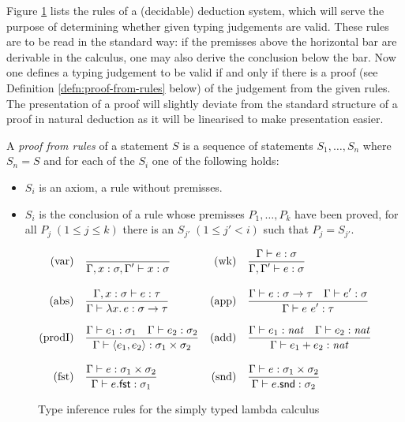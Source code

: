Figure \ref{fig:rules-typed-lambda} lists the rules of a (decidable) deduction
system, which will serve the purpose of determining whether given typing
judgements are valid. These rules are to be read in the standard way: if the
premisses above the horizontal bar are derivable in the calculus, one may also
derive the conclusion below the bar. Now one defines a typing judgement to be
valid if and only if there is a proof (see Definition
\ref{defn:proof-from-rules} below) of the judgement from the given rules. The
presentation of a proof will slightly deviate from the standard structure of a
proof in natural deduction as it will be linearised to make presentation easier.

\begin{defn}
\label{defn:proof-from-rules}
A \emph{proof from rules} of a statement $S$ is a sequence of statements
$S_1,\ldots,S_n$ where $S_n = S$ and for each of the $S_i$ one of the following
holds:
\begin{itemize}
\item $S_i$ is an axiom, \IE a rule without premisses.
\item $S_i$ is the conclusion of a rule whose premisses $P_1,\ldots,P_k$ 
  have been proved, \IE for all $P_j \;(1\leq j\leq k)$ there is an $S_{j'} \;(1\leq j'<i)$
  such that $P_j = S_{j'}$.
\end{itemize}
\end{defn}


\begin{figure}
  \begin{align*}
    \mathrm{(var)}\quad& \frac{\displaystyle }{\displaystyle \Gamma, x:\sigma, \Gamma' \vdash x:\sigma} &
    \mathrm{(wk)} \quad& \frac{\displaystyle \Gamma \vdash e : \sigma}{\displaystyle \Gamma,\Gamma' \vdash e : \sigma}\\[2ex]
    \mathrm{(abs)}\quad & \frac{\displaystyle \Gamma, x:\sigma \vdash e:\tau}{\displaystyle \Gamma \vdash {\lambda x.\,e} : \sigma\to\tau} &
    \mathrm{(app)}\quad & \frac{\displaystyle \Gamma \vdash e : \sigma\to\tau \quad \Gamma \vdash e' : \sigma}{\displaystyle \Gamma \vdash e\ e' : \tau}\\[2ex]
    \mathrm{(prodI)}\quad & \frac{\displaystyle \Gamma \vdash e_1:\sigma_1 \quad \Gamma \vdash e_2:\sigma_2}{\displaystyle \Gamma \vdash \langle e_1,e_2\rangle : \sigma_1 \times \sigma_2} &
    \mathrm{(add)}\quad&  \frac{\displaystyle \Gamma \vdash e_1 : \mathit{nat}\quad \Gamma \vdash e_2: \mathit{nat}}{\displaystyle \Gamma \vdash e_1 + e_2 : \mathit{nat}} \\[2ex]   
    \mathrm{(fst)} \quad & \frac{\displaystyle \Gamma \vdash e : \sigma_1 \times \sigma_2}{\displaystyle \Gamma \vdash e.\mathsf{fst} : \sigma_1} &
    \mathrm{(snd)} \quad & \frac{\displaystyle \Gamma \vdash e : \sigma_1 \times \sigma_2}{\displaystyle \Gamma \vdash e.\mathsf{snd} : \sigma_2} &
  \end{align*}
  \caption{Type inference rules for the simply typed lambda calculus}
  \label{fig:rules-typed-lambda}
\end{figure}

